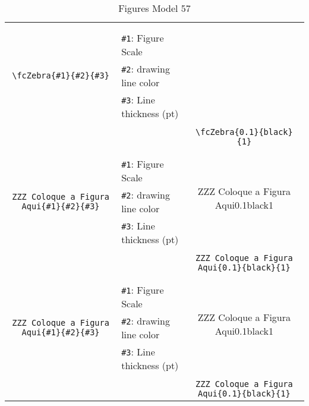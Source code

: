 \documentclass[x11names]{article}
\begin{document}
\begin{table}[H]
\begin{tabular}{|c|l|c|}
	&&\multirow{5}{*}{\fcZebra{0.1}{black}{1}}\\	&&\\	&\verb|#1|: Figure Scale &\\	\verb|\fcZebra{#1}{#2}{#3}|&	\verb|#2|: drawing line color &\\	&\verb|#3|: Line thickness (pt) &\\ &&\\&&	\verb|\fcZebra{0.1}{black}{1}|\\\hline 	
	&&\multirow{5}{*}{ZZZ Coloque a Figura Aqui{0.1}{black}{1}}\\	&&\\	&\verb|#1|: Figure Scale &\\	\verb|ZZZ Coloque a Figura Aqui{#1}{#2}{#3}|&	\verb|#2|: drawing line color &\\	&\verb|#3|: Line thickness (pt) &\\ &&\\&&	\verb|ZZZ Coloque a Figura Aqui{0.1}{black}{1}|\\\hline 	
	&&\multirow{5}{*}{ZZZ Coloque a Figura Aqui{0.1}{black}{1}}\\	&&\\	&\verb|#1|: Figure Scale &\\	\verb|ZZZ Coloque a Figura Aqui{#1}{#2}{#3}|&	\verb|#2|: drawing line color &\\	&\verb|#3|: Line thickness (pt) &\\ &&\\&&	\verb|ZZZ Coloque a Figura Aqui{0.1}{black}{1}|\\\hline 	\hline\end{tabular}\caption{Figures Model 57}\label{tab57}\end{table}
\end{document}
